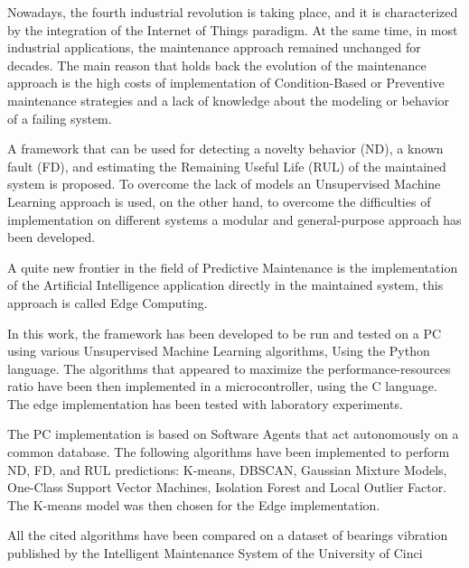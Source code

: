 Nowadays, the fourth industrial revolution is taking place, and it is characterized by the integration of the Internet of Things paradigm. At the same time, in most industrial applications, the maintenance approach remained unchanged for decades. The main reason that holds back the evolution of the maintenance approach is the high costs of implementation of Condition-Based or Preventive maintenance strategies and a lack of knowledge about the modeling or behavior of a failing system.

A framework that can be used for detecting a novelty behavior (ND), a known fault (FD), and estimating the Remaining Useful Life (RUL) of the maintained system is proposed. To overcome the lack of models an Unsupervised Machine Learning approach is used, on the other hand, to overcome the difficulties of implementation on different systems a modular and general-purpose approach has been developed.

A quite new frontier in the field of Predictive Maintenance is the implementation of the Artificial Intelligence application directly in the maintained system, this approach is called Edge Computing.

In this work, the framework has been developed to be run and tested on a PC using various Unsupervised Machine Learning algorithms, Using the Python language. The algorithms that appeared to maximize the performance-resources ratio have been then implemented in a microcontroller, using the C language. The edge implementation has been tested with laboratory experiments.

The PC implementation is based on Software Agents that act autonomously on a common database. The following algorithms have been implemented to perform ND, FD, and RUL predictions: K-means, DBSCAN, Gaussian Mixture Models, One-Class Support Vector Machines, Isolation Forest and Local Outlier Factor. The K-means model was then chosen for the Edge implementation.

All the cited algorithms have been compared on a dataset of bearings vibration published by the Intelligent Maintenance System of the University of Cinci